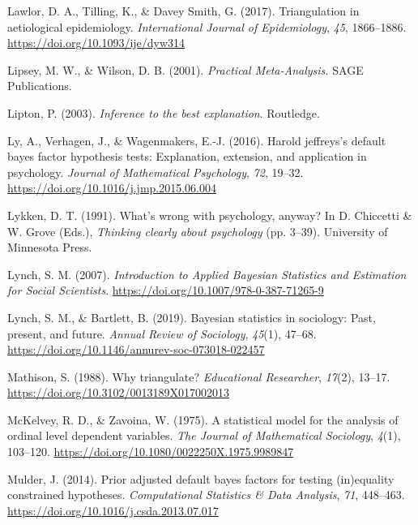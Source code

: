 \documentclass[
]{interact}
\newlength{\cslhangindent}
\newlength{\cslentryspacingunit} %
\newenvironment{CSLReferences}[2] %
 {%
  \setlength{\parindent}{0pt}
  \ifodd #1
  \let\oldpar\par
  \def\par{\hangindent=\cslhangindent\oldpar}
  \fi
  \setlength{\parskip}{#2\cslentryspacingunit}
 }%
 {}
\begin{document}
\begin{CSLReferences}{1}{0}
\leavevmode{}%
Lawlor, D. A., Tilling, K., \& Davey Smith, G. (2017). Triangulation in
aetiological epidemiology. \emph{International Journal of Epidemiology},
\emph{45}, 1866--1886. \url{https://doi.org/10.1093/ije/dyw314}

\leavevmode{}%
Lipsey, M. W., \& Wilson, D. B. (2001). \emph{Practical
{M}eta-{A}nalysis.} SAGE Publications.

\leavevmode{}%
Lipton, P. (2003). \emph{Inference to the best explanation}. Routledge.

\leavevmode{}%
Ly, A., Verhagen, J., \& Wagenmakers, E.-J. (2016). Harold jeffreys's
default bayes factor hypothesis tests: Explanation, extension, and
application in psychology. \emph{Journal of Mathematical Psychology},
\emph{72}, 19--32. \url{https://doi.org/10.1016/j.jmp.2015.06.004}

\leavevmode{}%
Lykken, D. T. (1991). What's wrong with psychology, anyway? In D.
Chiccetti \& W. Grove (Eds.), \emph{Thinking clearly about psychology}
(pp. 3--39). University of Minnesota Press.

\leavevmode{}%
Lynch, S. M. (2007). \emph{Introduction to {Applied} {Bayesian}
{Statistics} and {Estimation} for {Social} {Scientists}}.
\url{https://doi.org/10.1007/978-0-387-71265-9}

\leavevmode{}%
Lynch, S. M., \& Bartlett, B. (2019). Bayesian statistics in sociology:
Past, present, and future. \emph{Annual Review of Sociology},
\emph{45}(1), 47--68.
\url{https://doi.org/10.1146/annurev-soc-073018-022457}

\leavevmode{}%
Mathison, S. (1988). Why triangulate? \emph{Educational Researcher},
\emph{17}(2), 13--17. \url{https://doi.org/10.3102/0013189X017002013}

\leavevmode{}%
McKelvey, R. D., \& Zavoina, W. (1975). A statistical model for the
analysis of ordinal level dependent variables. \emph{The Journal of
Mathematical Sociology}, \emph{4}(1), 103--120.
\url{https://doi.org/10.1080/0022250X.1975.9989847}

\leavevmode{}%
Mulder, J. (2014). Prior adjusted default bayes factors for testing
(in)equality constrained hypotheses. \emph{Computational Statistics \&
Data Analysis}, \emph{71}, 448--463.
\url{https://doi.org/10.1016/j.csda.2013.07.017}


\end{CSLReferences}
\end{document}
